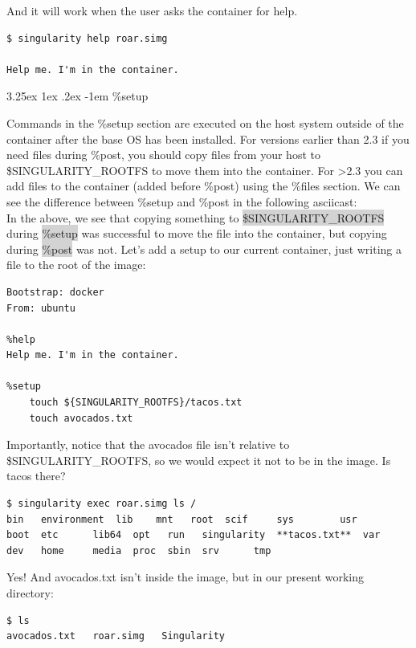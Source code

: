\documentclass[a4paper]{article}
\makeatletter
\renewcommand\paragraph{\@startsection{paragraph}{5}{\z@}%
  {3.25ex \@plus1ex \@minus.2ex}%
  {-1em}%
  {\normalfont\normalsize\bfseries}}
\makeatother
\begin{document}
And it will work when the user asks the container for help.

\begin{lstlisting}[frame=single] 
$ singularity help roar.simg 

Help me. I'm in the container.
\end{lstlisting}
	
\paragraph{\%setup}

Commands in the \%setup section are executed on the host system outside of the container after the base OS has been installed. For versions earlier than 2.3 if you need files during \%post, you should copy files from your host to \$SINGULARITY\_ROOTFS to move them into the container. For \textgreater 2.3 you can add files to the container (added before \%post) using the \%files section. We can see the difference between \%setup and \%post in the following asciicast:
\\[0.2in]
In the above, we see that copying something to \colorbox{lightgray}{\$SINGULARITY\_ROOTFS} during \colorbox{lightgray}{\%setup} was successful to move the file into the container, but copying during \colorbox{lightgray}{\%post} was not. Let’s add a setup to our current container, just writing a file to the root of the image:

\begin{lstlisting}[frame=single]  
Bootstrap: docker
From: ubuntu

%help
Help me. I'm in the container.

%setup
    touch ${SINGULARITY_ROOTFS}/tacos.txt
    touch avocados.txt
\end{lstlisting}

Importantly, notice that the avocados file isn’t relative to \$SINGULARITY\_ROOTFS, so we would expect it not to be in the image. Is tacos there?

\begin{lstlisting}[frame=single]  
$ singularity exec roar.simg ls /
bin   environment  lib	  mnt	root  scif	   sys	      usr
boot  etc	   lib64  opt	run   singularity  **tacos.txt**  var
dev   home	   media  proc	sbin  srv	   tmp
\end{lstlisting}

Yes! And avocados.txt isn’t inside the image, but in our present working directory:

\begin{lstlisting}[frame=single]  
$ ls
avocados.txt   roar.simg   Singularity
\end{lstlisting}
\end{document}
